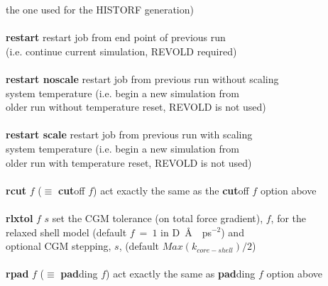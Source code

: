 \begin{tabbing}
\>                                              \> the one used for the HISTORF generation) \\
\>                                              \> \\
\> {\bf restart}                                \> restart job from end point of previous run \\
\>                                              \> (i.e. continue current simulation, REVOLD required) \\
\>                                              \> \\
\> {\bf restart noscale}                        \> restart job from previous run without scaling \\
\>                                              \> system temperature (i.e. begin a new simulation from \\
\>                                              \> older run without temperature reset, REVOLD is not used) \\
\>                                              \> \\
\> {\bf restart scale}                          \> restart job from previous run with scaling \\
\>                                              \> system temperature (i.e. begin a new simulation from \\
\>                                              \> older run with temperature reset, REVOLD is not used) \\
\>                                              \> \\
\> {\bf rcut} $f$  ($\equiv$ {\bf cut}off $f$)  \> act exactly the same as the {\bf cut}off $f$ option above \\
\>                                              \> \\
\> {\bf rlxtol} $f$ $s$                         \> set the CGM tolerance (on total force gradient), $f$, for the \\
\>                                              \> relaxed shell model (default $f~=~1$ in D~\AA~~ps$^{-2}$) and \\
\>                                              \> optional CGM stepping, $s$, (default $Max(k_{core-shell})/2$) \\
\>                                              \> \\
\> {\bf rpad} $f$  ($\equiv$ {\bf pad}ding $f$) \> act exactly the same as {\bf pad}ding $f$ option above \\

\end{tabbing}

